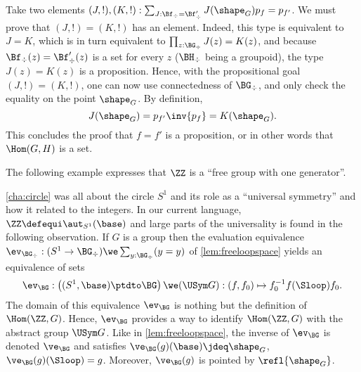 \begin{example}
   Take two elements $(J,!),(K,!):\sum_{J:\Bf_\div=\Bf'_\div}J(\shape_G)p_f=p_{f'}$.  We must prove that $(J,!) = (K,!)$ has
   an element.
  Indeed,
  this type is equivalent to $J=K$, which is in turn equivalent to
  $\prod_{z:\BG_\div}J(z)=K(z)$, and because $\Bf_\div(z)=\Bf'_\div(z)$
  is a set for every $z$ ($\BH_\div$ being a groupoid), the type
  $J(z)=K(z)$ is a proposition. Hence, with the propositional goal
  $(J,!) = (K,!)$, one can now use connectedness of $\BG_\div$, and
  only check the equality on the point $\shape_G$. By definition,
  \begin{displaymath}
    J(\shape_G) = p_{f'}\inv{p_f} = K(\shape_G).
  \end{displaymath}
  This concludes the proof that $f=f'$ is a proposition, or in other
  words that $\Hom(G,H)$ is a set.
\end{example}

The following example expresses that $\ZZ$ is a ``free group with one generator''.

\begin{example}
  \label{ex:Zinitial}
  \cref{cha:circle} was all about the circle $S^1$ and its role as a
  ``universal symmetry'' and how it related to the integers.  In our
  current language, $\ZZ\defequi\aut_{S^1}(\base)$ and large parts of
  the universality is found in the following observation.  If $G$ is a
  group then the evaluation equivalence
  $\ev_{\BG_\div}:(S^1\to \BG_\div)\we \sum_{y:\BG_\div}(y=y)$ of
  \cref{lem:freeloopspace} yields an equivalence of sets
  $$\ev_{\BG}:\left((S^1,\base)\ptdto \BG\right)\we (\USym G)
            : (f,f_0)\mapsto f_0^{-1}f(\Sloop)f_0.$$
  The domain of this equivalence $\ev_{\BG}$ is nothing but the
  definition of $\Hom(\ZZ,G)$. Hence, $\ev_{\BG}$ provides a way to
  identify $\Hom(\ZZ,G)$ with the abstract group $\USym G$.
Like in \cref{lem:freeloopspace}, the inverse of $\ev_{\BG}$
is denoted $\ve_{\BG}$ and satisfies $\ve_{\BG}(g)(\base)\jdeq\shape_G$,
$\ve_{\BG}(g)(\Sloop)= g$. Moreover, $\ve_{\BG}(g)$ is pointed by $\refl{\shape_G}$.
\end{example}

